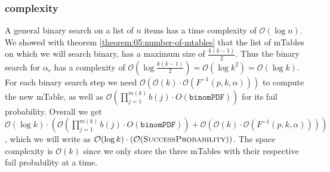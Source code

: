 \subsubsection{\algoBinomBinary complexity}\label{subsubsec:binom-binary-complexity}
A general binary search on a list of $n$ items has a time complexity of $\mathcal{O}(\log{}n)$. We showed with theorem \ref{theorem:05:number-of-mtables} that the list of mTables on which we will search binary, has a maximum size of $\frac{k(k-1)}{2}$.
Thus the binary search for $\alpha_c$ has a complexity of $\mathcal{O}(\log{}\frac{k(k-1)}{2}) = \mathcal{O}(\log{}k^2) = \mathcal{O}(\log{}k)$.
%
For each binary search step we need $\mathcal{O}(\mathcal{O}(k) \cdot \mathcal{O}(F^{-1}(p,k,\alpha)))$ to compute the new mTable, as well as $\mathcal{O}(\prod_{j=1}^{m(k)}b(j) \cdot O(\texttt{binomPDF}))$ for its fail probability.
%
Overall we get $\mathcal{O}(\log{}k) \cdot (\mathcal{O}(\prod_{j=1}^{m(k)}b(j) \cdot O(\texttt{binomPDF})) + \mathcal{O}(\mathcal{O}(k) \cdot \mathcal{O}(F^{-1}(p,k,\alpha))))$, which we will write as $\mathcal{O}(\log{}k) \cdot (\mathcal{O}(\texttt{{\sc SuccessProbability}}))$.
%
The space complexity is $\mathcal{O}(k)$ since we only store the three mTables with their respective fail probability at a time.

